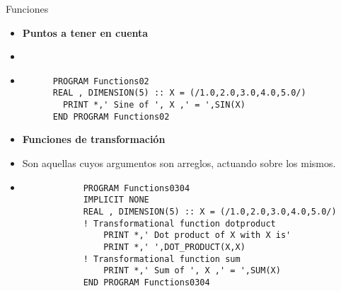 \begin{frame}[fragile]{Funciones}
 \begin{itemize}[<+(0)->]
  \item [] \textbf{Puntos a tener en cuenta}
  \item 
  \vspace{0.15cm}
  \item[]
      \begin{verbatim}
      PROGRAM Functions02
      REAL , DIMENSION(5) :: X = (/1.0,2.0,3.0,4.0,5.0/)
        PRINT *,' Sine of ', X ,' = ',SIN(X)
      END PROGRAM Functions02
      \end{verbatim}
  \item [] \textbf{Funciones de transformación}
  \item Son aquellas cuyos argumentos son arreglos, actuando sobre los mismos.
  \vspace{0.15cm}
  \item [] 
        \begin{verbatim}
            PROGRAM Functions0304     
            IMPLICIT NONE
            REAL , DIMENSION(5) :: X = (/1.0,2.0,3.0,4.0,5.0/)
            ! Transformational function dotproduct
                PRINT *,' Dot product of X with X is'
                PRINT *,' ',DOT_PRODUCT(X,X)
            ! Transformational function sum
                PRINT *,' Sum of ', X ,' = ',SUM(X)
            END PROGRAM Functions0304
        \end{verbatim}
 \end{itemize}
\end{frame}